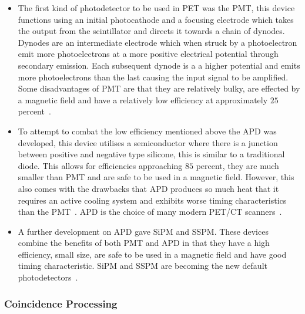                 \begin{itemize}
                    \item The first kind of photodetector to be used in \gls{PET} was the \gls{PMT}, this device functions using an initial photocathode and a focusing electrode which takes the output from the scintillator and directs it towards a chain of dynodes. Dynodes are an intermediate electrode which when struck by a photoelectron emit more photoelectrons at a more positive electrical potential through secondary emission. Each subsequent dynode is a a higher potential and emits more photoelectrons than the last causing the input signal to be amplified. Some disadvantages of \gls{PMT} are that they are relatively bulky, are effected by a magnetic field and have a relatively low efficiency at approximately $25$ percent~.
                    
                    \item To attempt to combat the low efficiency mentioned above the \gls{APD} was developed, this device utilises a semiconductor where there is a junction between positive and negative type silicone, this is similar to a traditional diode. This allows for efficiencies approaching $85$ percent, they are much smaller than \gls{PMT} and are safe to be used in a magnetic field. However, this also comes with the drawbacks that \gls{APD} produces so much heat that it requires an active cooling system and exhibits worse timing characteristics than the \gls{PMT}~. \gls{APD} is the choice of many modern \gls{PET}/\gls{CT} scanners~.
                    
                    \item A further development on \gls{APD} gave \gls{SiPM} and \gls{SSPM}. These devices combine the benefits of both \gls{PMT} and \gls{APD} in that they have a high efficiency, small size, are safe to be used in a magnetic field and have good timing characteristic. \gls{SiPM} and \gls{SSPM} are becoming the new default photodetectors~.
                \end{itemize}
            
            \subsubsection{Coincidence Processing} \label{coincidence_processing}
                \blindtext
            
